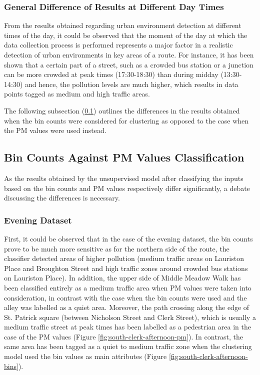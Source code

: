 \documentclass[bsc,frontabs,twoside,singlespacing, parskip,deptreport]{infthesis}     %
\begin{document}
\subsubsection*{General Difference of Results at Different Day Times}

From the results obtained regarding urban environment detection at different times of the day, it could be observed that the moment of the day at which the data collection process is performed represents a major factor in a realistic detection of urban environments in key areas of a route. For instance, it has been shown that a certain part of a street, such as a crowded bus station or a junction can be more crowded at peak times (17:30-18:30) than during midday (13:30-14:30) and hence, the pollution levels are much higher, which results in data points tagged as medium and high traffic areas.

The following subsection (\ref{subsec:bin-counts-pm-vals}) outlines the differences in the results obtained when the bin counts were considered for clustering as opposed to the case when the PM values were used instead.

\subsection{Bin Counts Against PM Values Classification}
\label{subsec:bin-counts-pm-vals}

As the results obtained by the unsupervised model after classifying the inputs based on the bin counts and PM values respectively differ significantly, a debate discussing the differences is necessary. 

\subsubsection*{Evening Dataset}

First, it could be observed that in the case of the evening dataset, the bin counts prove to be much more sensitive as for the northern side of the route, the classifier detected areas of higher pollution (medium traffic areas on Lauriston Place and Broughton Street and high traffic zones around crowded bus stations on Lauriston Place).  In addition, the upper side of Middle Meadow Walk has been classified entirely as a medium traffic area when PM values were taken into consideration, in contrast with the case when the bin counts were used and the alley was labelled as a quiet area. Moreover, the path crossing along the edge of St. Patrick square (between Nicholson Street and Clerk Street), which is usually a medium traffic street at peak times has been labelled as a pedestrian area in the case of the PM values (Figure \ref{fig:south-clerk-afternoon-pm}). In contrast, the same area has been tagged as a quiet to medium traffic zone when the clustering model used the bin values as main attributes (Figure \ref{fig:south-clerk-afternoon-bins}).
\end{document}
